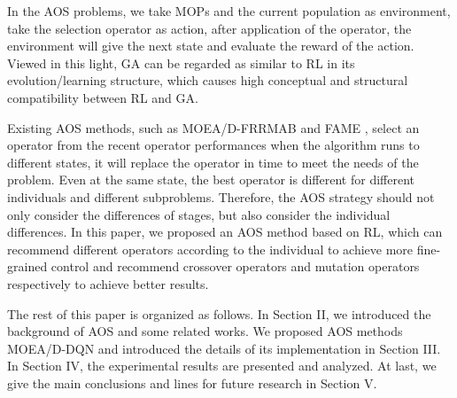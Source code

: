 \documentclass[journal]{IEEEtran}
\newcommand{\XG}[1]{\textcolor[rgb]{0.00,0.00,1.00}{#1}}
\begin{document}
In the AOS problems, we take MOPs and the current population as environment, take the selection operator as action, after application of the operator, the environment will give the next state and evaluate the reward of the action.
Viewed in this light, GA can be regarded as similar to RL in its evolution/learning structure, which causes high conceptual and structural compatibility between RL and GA.

Existing AOS methods, such as MOEA/D-FRRMAB \cite{frrmab} and FAME \cite{fame}, select an operator from the recent operator performances when the algorithm runs to different states, it will replace the operator in time to meet the needs of the problem.
Even at the same state, the best operator is different for different individuals and different subproblems. \XG{ Therefore, the AOS strategy should not only consider the differences of stages, but also consider the individual differences.}
In this paper, we proposed an AOS method based on RL, which can recommend different operators according to the individual to achieve more fine-grained control and recommend crossover operators and mutation operators respectively to achieve better results.

The rest of this paper is organized as follows. In Section II, we introduced the background of AOS and some related works. We proposed AOS methods MOEA/D-DQN and introduced the details of its implementation in Section III. In Section IV, the experimental results are presented and analyzed. At last, we give the main conclusions and lines for future research in Section V.
\end{document}
